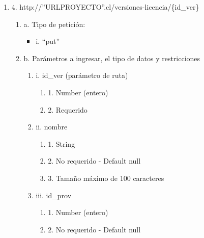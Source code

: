 \begin{enumerate}
    \item 4. http://”URLPROYECTO”.cl/versiones-licencia/\{id\_ver\}
    \begin{enumerate}
        \item a. Tipo de petición:
            \begin{itemize}
               \item i. “put”
            \end{itemize}
        \item b. Parámetros a ingresar, el tipo de datos y restricciones
            \begin{enumerate}
                \item i. id\_ver (parámetro de ruta)
                    \begin{enumerate}
                        \item 1. Number (entero)
                        \item 2. Requerido
                    \end{enumerate}
                \item ii. nombre
                    \begin{enumerate}
                        \item 1. String
                        \item 2. No requerido - Default null
                        \item 3. Tamaño máximo de 100 caracteres
                    \end{enumerate}
                \item iii. id\_prov
                    \begin{enumerate}
                        \item 1. Number (entero)
                        \item 2. No requerido - Default null
                    \end{enumerate}
            \end{enumerate}
    \end{enumerate}


\end{enumerate}
